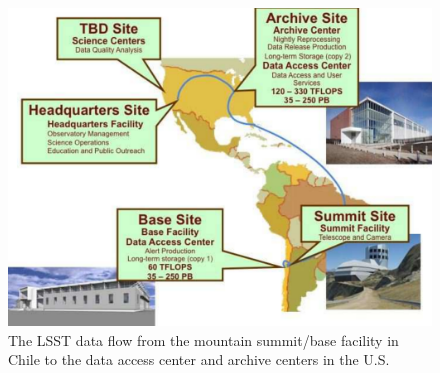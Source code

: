\documentclass{emulateapj}
\begin{document}
\begin{figure}
\hskip 0.5in
\includegraphics[width=0.9\hsize,clip]{DMX2.pdf}
\caption{The LSST data flow from the mountain summit/base facility in
Chile to the data access center and archive centers in the U.S.} 
\label{Fig:DM2}
\end{figure}
\end{document}
